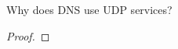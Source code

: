 \documentclass[../../main.tex]{subfiles}
\begin{document}
\begin{wts}
Why does DNS use UDP services? 
\end{wts}
\begin{proof}

\end{proof}
\end{document}
